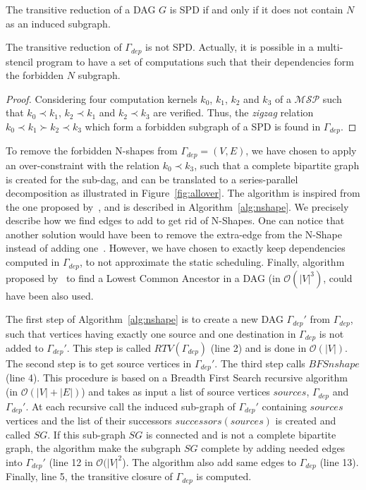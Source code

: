 \begin{myth}
The transitive reduction of a DAG $G$ is SPD if and only if it does not contain $N$ as an induced subgraph.
\end{myth}

\begin{myprop}
The transitive reduction of $\Gamma_{dep}$ is not SPD. Actually, it is possible in a multi-stencil program to have a set of computations such that their dependencies form the forbidden $N$ subgraph.
\end{myprop}

\begin{proof}
Considering four computation kernels $k_0$, $k_1$, $k_2$ and $k_3$ of a $\mathcal{MSP}$ such that $k_0 \prec k_1$, $k_2 \prec k_1$ and $k_2 \prec k_3$ are verified. Thus, the \emph{zigzag} relation $k_0 \prec k_1 \succ k_2 \prec k_3$ which form a forbidden subgraph of a SPD is found in $\Gamma_{dep}$.
\end{proof}

To remove the forbidden N-shapes from $\Gamma_{dep}=(V,E)$, we have chosen to apply an over-constraint with the relation $k_0 \prec k_3$, such that a complete bipartite graph is created for the sub-dag, and can be translated to a series-parallel decomposition as illustrated in Figure~\ref{fig:allover}. The algorithm is inspired from the one proposed by~\cite{Mitchell:2004:CMV:1082101.1082117}, and is described in Algorithm~\ref{alg:nshape}. We precisely describe how we find edges to add to get rid of N-Shapes. One can notice that another solution would have been to remove the extra-edge from the N-Shape instead of adding one~\cite{}. However, we have chosen to exactly keep dependencies computed in $\Gamma_{dep}$, to not approximate the static scheduling. Finally, algorithm proposed by~\cite{Bender200575} to find a Lowest Common Ancestor in a DAG (in $\mathcal{O}(|V|^3)$, could have been also used.

The first step of Algorithm~\ref{alg:nshape} is to create a new DAG $\Gamma_{dep}'$ from $\Gamma_{dep}$, such that vertices having exactly one source and one destination in $\Gamma_{dep}$ is not added to $\Gamma_{dep}'$. This step is called $RTV(\Gamma_{dep})$ (line 2) and is done in $\mathcal{O}(|V|)$. The second step is to get source vertices in $\Gamma_{dep}'$. The third step calls $BFSnshape$ (line 4). This procedure is based on a Breadth First Search recursive algorithm (in $\mathcal{O}(|V|+|E|)$) and takes as input a list of source vertices $sources$, $\Gamma_{dep}$ and $\Gamma_{dep}'$. At each recursive call the induced sub-graph of $\Gamma_{dep}'$ containing $sources$ vertices and the list of their successors $successors(sources)$ is created and called $SG$. If this sub-graph $SG$ is connected and is not a complete bipartite graph, the algorithm make the subgraph $SG$ complete by adding needed edges into $\Gamma_{dep}'$ (line 12 in $\mathcal{O}(|V|^2$). The algorithm also add same edges to $\Gamma_{dep}$ (line 13). Finally, line 5, the transitive closure of $\Gamma_{dep}$ is computed.


